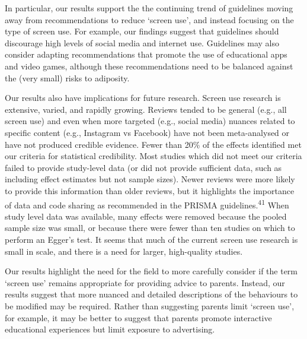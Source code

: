 \documentclass[
  english,
  man]{apa6}
\begin{document}
In particular, our results support the the continuing trend of guidelines moving away from recommendations to reduce `screen use', and instead focusing on the type of screen use.
For example, our findings suggest that guidelines should discourage high levels of social media and internet use.
Guidelines may also consider adapting recommendations that promote the use of educational apps and video games, although these recommendations need to be balanced against the (very small) risks to adiposity.

Our results also have implications for future research.
Screen use research is extensive, varied, and rapidly growing.
Reviews tended to be general (e.g., all screen use) and even when more targeted (e.g., social media) nuances related to specific content (e.g., Instagram vs Facebook) have not been meta-analysed or have not produced credible evidence.
Fewer than 20\% of the effects identified met our criteria for statistical credibility.
Most studies which did not meet our criteria failed to provide study-level data (or did not provide sufficient data, such as including effect estimates but not sample sizes).
Newer reviews were more likely to provide this information than older reviews, but it highlights the importance of data and code sharing as recommended in the PRISMA guidelines.\textsuperscript{41}
When study level data was available, many effects were removed because the pooled sample size was small, or because there were fewer than ten studies on which to perform an Egger's test.
It seems that much of the current screen use research is small in scale, and there is a need for larger, high-quality studies.

Our results highlight the need for the field to more carefully consider if the term `screen use' remains appropriate for providing advice to parents.
Instead, our results suggest that more nuanced and detailed descriptions of the behaviours to be modified may be required.
Rather than suggesting parents limit `screen use', for example, it may be better to suggest that parents promote interactive educational experiences but limit exposure to advertising.
\end{document}
